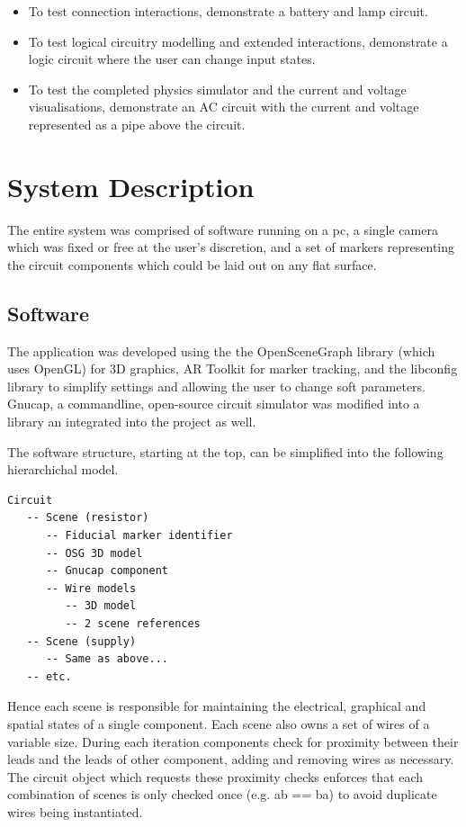 \begin{itemize}
\item To test connection interactions, demonstrate a battery and lamp circuit.
\item To test logical circuitry modelling and extended interactions, demonstrate a logic circuit where the user can change input states.
\item To test the completed physics simulator and the current and voltage visualisations, demonstrate an AC circuit with the current and voltage represented as a pipe above the circuit.
\end{itemize}

\section{System Description}
The entire system was comprised of software running on a pc,
a single camera which was fixed or free at the user's discretion,
and a set of markers representing the circuit components which
could be laid out on any flat surface.

\subsection{Software}
The application was developed using the the OpenSceneGraph library
(which uses OpenGL) for 3D graphics, AR Toolkit for marker
tracking, and the libconfig library to simplify settings and
allowing the user to change soft parameters. Gnucap, a commandline,
open-source circuit simulator was modified into a library an
integrated into the project as well.

The software structure, starting at the top, can be simplified into
the following hierarchichal model.

\begin{verbatim}
Circuit
   -- Scene (resistor)
      -- Fiducial marker identifier
      -- OSG 3D model
      -- Gnucap component
      -- Wire models
         -- 3D model
         -- 2 scene references
   -- Scene (supply)
      -- Same as above...
   -- etc.
\end{verbatim}

Hence each scene is responsible for maintaining the electrical, graphical
and spatial states of a single component. Each scene also owns a set of
wires of a variable size. During each iteration components check for
proximity between their leads and the leads of other component, adding
and removing wires as necessary. The circuit object which requests these
proximity checks enforces that each combination of scenes is only checked
once (e.g. ab == ba) to avoid duplicate wires being instantiated.

